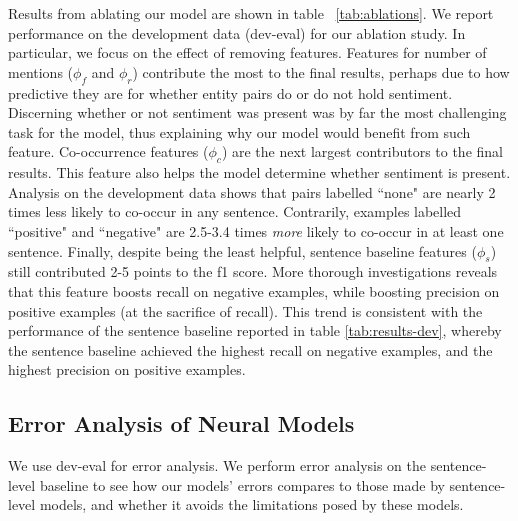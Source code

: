 \documentclass[11pt,a4paper]{article}
\begin{document}
Results from ablating our model are shown in table ~\ref{tab:ablations}.
We report performance on the development data (dev-eval) for our ablation study.
In particular, we focus on the effect of removing features.
Features for number of mentions ($\phi_f$ and $\phi_r$) contribute the most to the final results, perhaps due to how predictive they are for whether entity pairs do or do not hold sentiment.
Discerning whether or not sentiment was present was by far the most challenging task for the model, thus explaining why our model would benefit from such feature.
Co-occurrence features ($\phi_c$) are the next largest contributors to the final results.
This feature also helps the model determine whether sentiment is present.
Analysis on the development data shows that pairs labelled ``none"  are nearly 2 times less likely to co-occur in any sentence. Contrarily, examples labelled ``positive" and ``negative" are 2.5-3.4 times \textit{more} likely to co-occur in at least one sentence.
Finally, despite being the least helpful, sentence baseline features ($\phi_s$) still contributed 2-5 points to the f1 score.
More thorough investigations reveals that this feature boosts recall on negative examples, while boosting precision on positive examples (at the sacrifice of recall).
This trend is consistent with the performance of the sentence baseline reported in table \ref{tab:results-dev}, whereby the sentence baseline achieved the highest recall on negative examples, and the highest precision on positive examples.

\subsection{Error Analysis of Neural Models}
We use dev-eval for error analysis.
We perform error analysis on the sentence-level baseline to see how our models' errors compares to those made by sentence-level models, and whether it avoids the limitations posed by these models.
\end{document}
